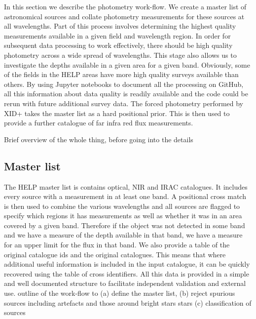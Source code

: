 \documentclass[usenatbib]{mnras}
\begin{document}
In this section we describe the photometry work-flow.  We create a master list 
of astronomical sources and collate photometry measurements for these sources 
at all wavelengths. Part of this process involves determining the highest 
quality measurements available in a given field and wavelength region. In order 
for subsequent data processing to work effectively, there should be high quality 
photometry across a wide spread of wavelengths. This stage also allows us to 
investigate the depths available in a given area for a given band. Obviously,
some of the fields in the HELP areas have more high quality surveys available than others.
By using Jupyter notebooks to document all the processing on GitHub, all this 
information about data quality is readily available and the code could be rerun with future 
additional survey data. The forced photometry performed by XID+ takes the master list as a hard positional prior. This is then used to provide a further catalogue of far infra red flux measurements.


Brief overview of the whole thing, before going into the details 

\subsection[Master List\\ {\color{red}Basically a very brief summary of Raph's paper, but really just pointing to it}]{Master list}
\label{sec:masterlist}
The HELP master list is contains optical, NIR and IRAC catalogues. It includes every 
source with a measurement in at least one band. A positional cross match is then
used to combine the various wavelengths and all sources are flagged to specify
which regions it has measurements as well as whether it was in an area covered by a
given band. Therefore if the object was not detected in some band and we have a measure 
of the depth available in that band, we have a measure for an upper limit for the flux in
that band. We also provide a table of the original catalogue ids and the original catalogues.
This means that where additional useful information is included in the input catalogue,
it can be quickly recovered using the table of cross identifiers. All this data is provided in a
simple and well documented structure to facilitate independent validation and external use.
{\color{red} outline of the work-flow to (a) define the master list, (b) reject
spurious sources including artefacts and those around bright stars stars (c)
classification of sources }
\end{document}
